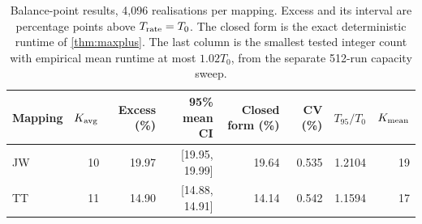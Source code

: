 \begin{table}[htbp]
\centering\small
\begin{tabular}{lrrrrrrr}
\toprule
Mapping & $K_{\rm avg}$ & Excess (\%) & 95\% mean CI & Closed form (\%) & CV (\%) & $T_{95}/T_0$ & $K_{\rm mean}$\\\midrule
JW & 10 & 19.97 & [19.95, 19.99] & 19.64 & 0.535 & 1.2104 & 19\\
TT & 11 & 14.90 & [14.88, 14.91] & 14.14 & 0.542 & 1.1594 & 17\\
\bottomrule
\end{tabular}
\caption{Balance-point results, 4,096 realisations per mapping. Excess and its interval are percentage points above $T_{\rm rate}=T_0$. The closed form is the exact deterministic runtime of \cref{thm:maxplus}. The last column is the smallest tested integer count with empirical mean runtime at most $1.02T_0$, from the separate 512-run capacity sweep.}
\label{tab:baseline}
\end{table}

